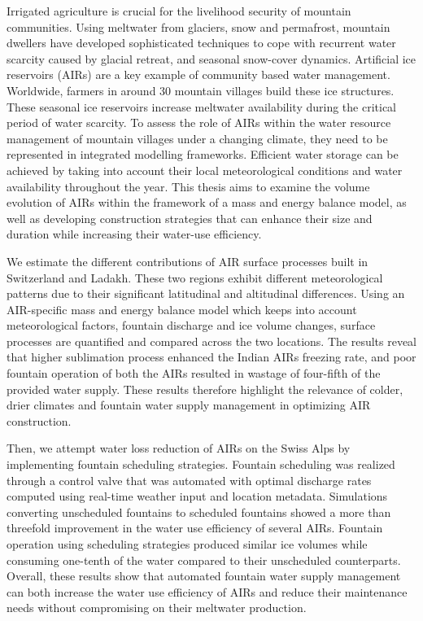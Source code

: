 %
\label{sec:abstract}

Irrigated agriculture is crucial for the livelihood security of mountain communities. Using meltwater from
glaciers, snow and permafrost, mountain dwellers have developed sophisticated techniques to cope with recurrent
water scarcity caused by glacial retreat, and seasonal snow-cover dynamics. Artificial ice
reservoirs (AIRs) are a key example of community based water management. Worldwide, farmers in around 30 mountain
villages build these ice structures. These seasonal ice reservoirs increase meltwater availability during the
critical period of water scarcity. To assess the role of AIRs within the water resource management of
mountain villages under a changing climate, they need to be represented in integrated modelling frameworks.
Efficient water storage can be achieved by taking into account their local meteorological conditions and
water availability throughout the year. This thesis aims to examine the volume evolution of AIRs within the
framework of a mass and energy balance model, as well as developing construction strategies that can enhance
their size and duration while increasing their water-use efficiency. 

We estimate the different contributions of AIR surface processes built in Switzerland and
Ladakh. These two regions exhibit different meteorological patterns due to their significant latitudinal
and altitudinal differences. Using an AIR-specific mass and energy balance model which keeps into account
meteorological factors, fountain discharge and ice volume changes, surface processes are quantified and compared
across the two locations. The results reveal that higher sublimation process enhanced the Indian AIRs freezing
rate, and poor fountain operation of both the AIRs resulted in wastage of four-fifth of the provided water supply. 
These results therefore highlight the relevance of colder, drier climates and fountain water supply
management in optimizing AIR construction.  

Then, we attempt water loss reduction of AIRs on the Swiss Alps by implementing
fountain scheduling strategies. Fountain scheduling was realized through a control valve that was automated with
optimal discharge rates computed using real-time weather input and location metadata. Simulations converting
unscheduled fountains to scheduled fountains showed a more than threefold improvement in the water use
efficiency of several AIRs. Fountain operation using scheduling strategies produced similar ice volumes while
consuming one-tenth of the water compared to their unscheduled counterparts.  Overall, these results show that
automated fountain water supply management can both increase the water use efficiency of AIRs and reduce their
maintenance needs without compromising on their meltwater production.

